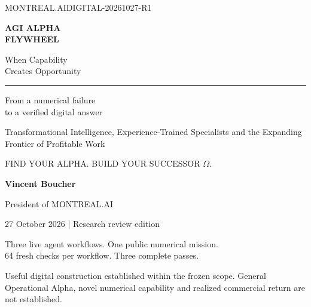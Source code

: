 \begin{titlepage}
\pagecolor{DeepPurple}\color{white}
\vspace*{0.45in}
{\sffamily\small MONTREAL.AI\hfill DIGITAL-20261027-R1\par}
\vspace{0.85in}
{\sffamily\fontsize{35}{40}\selectfont\bfseries AGI ALPHA\\FLYWHEEL\par}
\vspace{0.24in}
{\sffamily\fontsize{23}{29}\selectfont When Capability\\Creates Opportunity\par}
\vspace{0.42in}
{\color{white!70}\rule{0.9\linewidth}{0.7pt}\par}
\vspace{0.25in}
{\sffamily\fontsize{18}{24}\selectfont From a numerical failure\\to a verified digital answer\par}
\vspace{0.25in}
{\large Transformational Intelligence, Experience-Trained Specialists and the Expanding Frontier of Profitable Work\par}
\vfill
{\sffamily\small FIND YOUR ALPHA. BUILD YOUR SUCCESSOR $\Omega$.\par}\vspace{0.25in}
{\sffamily\bfseries Vincent Boucher\par}
{\sffamily President of MONTREAL.AI\par}
\vspace{0.3in}
{\sffamily\small 27 October 2026 | Research review edition\par}
\vspace{0.2in}
{\small Three live agent workflows. One public numerical mission.\\64 fresh checks per workflow. Three complete passes.\par}
\vspace{0.15in}
{\footnotesize Useful digital construction established within the frozen scope. General Operational Alpha, novel numerical capability and realized commercial return are not established.\par}
\end{titlepage}
\nopagecolor\color{Ink}\setcounter{page}{1}
